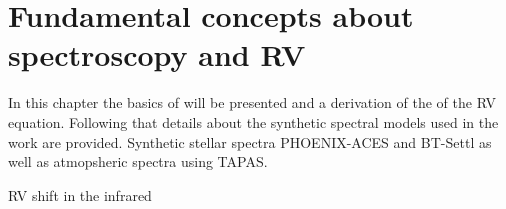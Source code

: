 
\chapter{Fundamental concepts about spectroscopy and RV}
\label{cha:concepts}

In this chapter the basics of \nir{} will be presented and a derivation of the of the RV equation. Following that details about the synthetic spectral models used in the work are provided. Synthetic stellar spectra {PHOENIX-ACES} and {BT-Settl} as well as atmopsheric spectra using {TAPAS}.










RV shift in the infrared